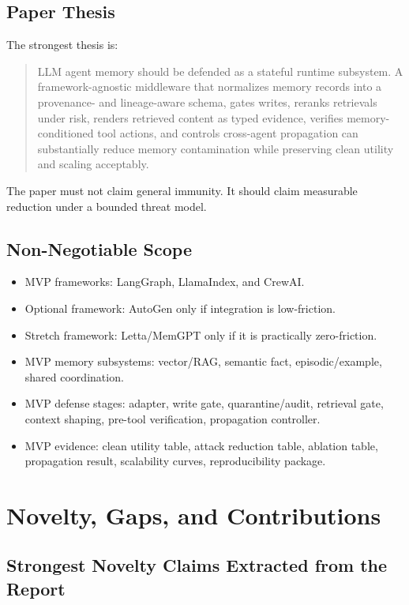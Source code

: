 \documentclass[11pt,oneside]{report}
\begin{document}
\section{Paper Thesis}

The strongest thesis is:

\begin{quote}
LLM agent memory should be defended as a stateful runtime subsystem. A framework-agnostic middleware
that normalizes memory records into a provenance- and lineage-aware schema, gates writes, reranks
retrievals under risk, renders retrieved content as typed evidence, verifies memory-conditioned tool
actions, and controls cross-agent propagation can substantially reduce memory contamination while
preserving clean utility and scaling acceptably.
\end{quote}

The paper must not claim general immunity. It should claim measurable reduction under a bounded
threat model.

\section{Non-Negotiable Scope}

\begin{itemize}
  \item MVP frameworks: LangGraph, LlamaIndex, and CrewAI.
  \item Optional framework: AutoGen only if integration is low-friction.
  \item Stretch framework: Letta/MemGPT only if it is practically zero-friction.
  \item MVP memory subsystems: vector/RAG, semantic fact, episodic/example, shared coordination.
  \item MVP defense stages: adapter, write gate, quarantine/audit, retrieval gate, context shaping,
        pre-tool verification, propagation controller.
  \item MVP evidence: clean utility table, attack reduction table, ablation table, propagation
        result, scalability curves, reproducibility package.
\end{itemize}

\chapter{Novelty, Gaps, and Contributions}

\section{Strongest Novelty Claims Extracted from the Report}
\end{document}

